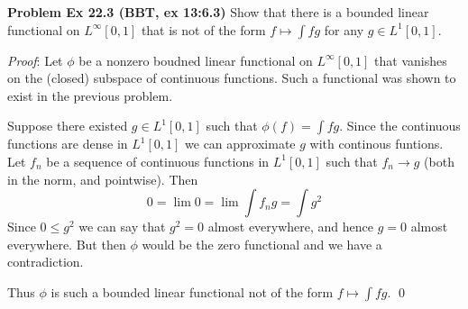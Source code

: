 \documentclass[12pt]{article}
\newcommand{\problem}[1]{\hspace{-4 ex} \large \textbf{Problem #1} }
\renewenvironment{proof}{\hspace{-4 ex} \emph{Proof}:}{\qed}
\newcommand{\RR}{\mathbb{R}}
\begin{document}

\bigbreak
\problem{Ex 22.3 (BBT, ex 13:6.3)} Show that there is a bounded linear functional on $L^\infty[0,1]$ that is not of the form $f\mapsto\int fg$ for any $g\in L^1[0,1]$. \bigbreak

	\begin{proof}
		Let $\phi$ be a nonzero boudned linear functional on $L^\infty[0,1]$ that vanishes on the (closed) subspace of continuous functions. Such a functional was shown to exist in the previous problem. \bigbreak
		
		Suppose there existed $g \in L^1[0,1]$ such that $\phi(f) = \int fg$. Since the continuous functions are dense in $L^1[0,1]$ we can approximate $g$ with continous funtions. Let $f_n$ be a sequence of continuous functions in $L^1[0,1]$ such that $f_n \to g$ (both in the norm, and pointwise). Then 
		$$
		0 = \lim 0 = \lim \int f_n g = \int g^2
		$$
		Since $0 \leq g^2$ we can say that $g^2 = 0$ almost everywhere, and hence $g = 0$ almost everywhere. But then $\phi$ would be the zero functional and we have a contradiction. \bigbreak
		
		Thus $\phi$ is such a bounded linear functional not of the form $f \mapsto \int fg$.
	\end{proof}
\end{document}
